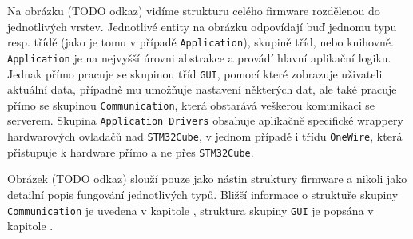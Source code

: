 Na obrázku (TODO odkaz) vidíme strukturu celého firmware rozdělenou do jednotlivých vrstev.
Jednotlivé entity na obrázku odpovídají buď jednomu typu resp. třídě (jako je tomu v případě \texttt{Application}),
skupině tříd, nebo knihovně.
\texttt{Application} je na nejvyšší úrovni abstrakce a provádí hlavní aplikační logiku.
Jednak přímo pracuje se skupinou tříd \texttt{GUI}, pomocí které zobrazuje uživateli aktuální data,
případně mu umožňuje nastavení některých dat, ale také pracuje přímo se skupinou \texttt{Communication},
která obstarává veškerou komunikaci se serverem.
Skupina \texttt{Application Drivers} obsahuje aplikačně specifické wrappery hardwarových ovladačů nad
\texttt{STM32Cube}, v jednom případě i třídu \texttt{OneWire}, která přistupuje k hardware přímo
a ne přes \texttt{STM32Cube}.

Obrázek (TODO odkaz) slouží pouze jako nástin struktury firmware a nikoli jako detailní popis
fungování jednotlivých typů.
Bližší informace o struktuře skupiny \texttt{Communication} je uvedena v kapitole ,
struktura skupiny \texttt{GUI} je popsána v kapitole .

